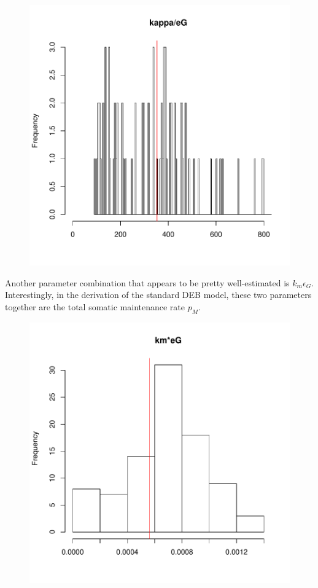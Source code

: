 \documentclass[12pt,reqno,final]{amsart}
\theoremstyle{plain}
\numberwithin{equation}{part}
\begin{document}
\begin{figure}
\includegraphics{Solving_the_problem_of_parameter_covariation-005}
\end{figure}

Another parameter combination that appears to be pretty well-estimated
is $k_m \epsilon_G$. Interestingly, in the derivation of the standard
DEB model, these two parameters together are the total somatic
maintenance rate $p_M$.

\begin{figure}
\includegraphics{Solving_the_problem_of_parameter_covariation-006}
\end{figure}
\end{document}
